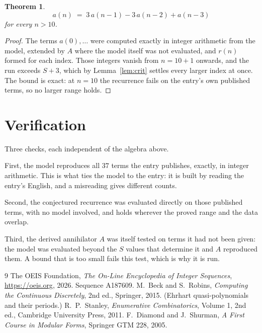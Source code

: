 \documentclass[11pt,a4paper]{article}
\theoremstyle{plain}
\newtheorem{theorem}{Theorem}
\theoremstyle{definition}
\begin{document}
\begin{theorem}
\[
a(n)\;=\;3\,a(n-1) - 3\,a(n-2) + a(n-3)
\]
for every $n>10$.
\end{theorem}

\begin{proof}
The terms $a(0),\dots$ were computed exactly in integer arithmetic from the model, extended by
$A$ where the model itself was not evaluated, and $r(n)$ formed for each index. Those integers
vanish from $n=10+1$ onwards, and the run exceeds $S+3$, which by
Lemma~\ref{lem:crit} settles every larger index at once. The bound is exact: at $n=10$ the recurrence fails on the entry's own published terms, so no larger range holds.
\end{proof}

\section{Verification}

Three checks, each independent of the algebra above.

First, the model reproduces all $37$ terms the entry publishes, exactly, in integer
arithmetic. This is what ties the model to the entry: it is built by reading the entry's
English, and a misreading gives different counts.

Second, the conjectured recurrence was evaluated directly on those published terms, with no
model involved, and holds wherever the proved range and the data overlap.

Third, the derived annihilator $A$ was itself tested on terms it had not been given: the model
was evaluated beyond the $S$ values that determine it and $A$ reproduced them. A bound that is
too small fails this test, which is why it is run.

\begin{thebibliography}{9}
 The OEIS Foundation, \emph{The On-Line Encyclopedia of Integer
Sequences}, \url{https://oeis.org}, 2026. Sequence A187609.
 M.~Beck and S.~Robins, \emph{Computing the Continuous Discretely},
2nd ed., Springer, 2015. (Ehrhart quasi-polynomials and their periods.)
 R.~P.~Stanley, \emph{Enumerative Combinatorics}, Volume 1, 2nd ed.,
Cambridge University Press, 2011.
 F.~Diamond and J.~Shurman, \emph{A First Course in Modular Forms},
Springer GTM 228, 2005.
\end{thebibliography}
\end{document}

